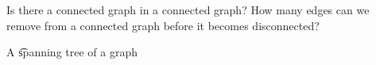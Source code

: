 
\sbasic














\sstart
{}


Is there a  connected graph in a connected graph?
How many edges can we remove from a connected graph before it becomes disconnected?


A \t{spanning tree of a graph}
\strats
